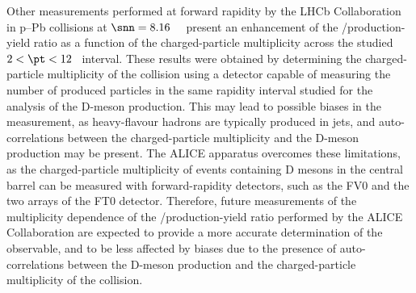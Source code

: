 Other measurements performed at forward rapidity by the LHCb Collaboration in p--Pb collisions at $\snn=8.16$~\tev~\cite{LHCb:2023rpm} present an enhancement of the \ds/\dpl production-yield ratio as a function of the charged-particle multiplicity across the studied \mbox{$2<\pt<12$~\gevc} interval. These results were obtained by determining the charged-particle multiplicity of the collision using a detector capable of measuring the number of produced particles in the same rapidity interval studied for the analysis of the D-meson production. This may lead to possible biases in the measurement, as heavy-flavour hadrons are typically produced in jets, and auto-correlations between the charged-particle multiplicity and the D-meson production may be present. The ALICE apparatus overcomes these limitations, as the charged-particle multiplicity of events containing D mesons in the central barrel can be measured with forward-rapidity detectors, such as the FV0 and the two arrays of the FT0 detector. Therefore, future measurements of the multiplicity dependence of the \ds/\dpl production-yield ratio performed by the ALICE Collaboration are expected to provide a more accurate determination of the observable, and to be less affected by biases due to the presence of auto-correlations between the D-meson production and the charged-particle multiplicity of the collision. 
